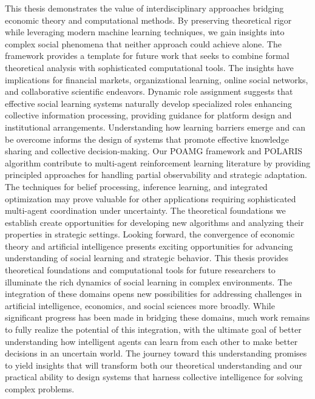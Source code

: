 This thesis demonstrates the value of interdisciplinary approaches bridging economic theory and computational methods. By preserving theoretical rigor while leveraging modern machine learning techniques, we gain insights into complex social phenomena that neither approach could achieve alone. The framework provides a template for future work that seeks to combine formal theoretical analysis with sophisticated computational tools.
The insights have implications for financial markets, organizational learning, online social networks, and collaborative scientific endeavors. Dynamic role assignment suggests that effective social learning systems naturally develop specialized roles enhancing collective information processing, providing guidance for platform design and institutional arrangements. Understanding how learning barriers emerge and can be overcome informs the design of systems that promote effective knowledge sharing and collective decision-making.
Our POAMG framework and POLARIS algorithm contribute to multi-agent reinforcement learning literature by providing principled approaches for handling partial observability and strategic adaptation. The techniques for belief processing, inference learning, and integrated optimization may prove valuable for other applications requiring sophisticated multi-agent coordination under uncertainty. The theoretical foundations we establish create opportunities for developing new algorithms and analyzing their properties in strategic settings.
Looking forward, the convergence of economic theory and artificial intelligence presents exciting opportunities for advancing understanding of social learning and strategic behavior. This thesis provides theoretical foundations and computational tools for future researchers to illuminate the rich dynamics of social learning in complex environments. The integration of these domains opens new possibilities for addressing challenges in artificial intelligence, economics, and social sciences more broadly. While significant progress has been made in bridging these domains, much work remains to fully realize the potential of this integration, with the ultimate goal of better understanding how intelligent agents can learn from each other to make better decisions in an uncertain world. The journey toward this understanding promises to yield insights that will transform both our theoretical understanding and our practical ability to design systems that harness collective intelligence for solving complex problems.
